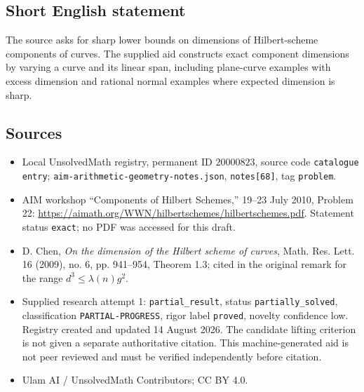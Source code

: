 \documentclass[11pt]{article}
\begin{document}
\subsection{Short English statement}
The source asks for sharp lower bounds on dimensions of Hilbert-scheme components of curves. The supplied aid constructs exact component dimensions by varying a curve and its linear span, including plane-curve examples with excess dimension and rational normal examples where expected dimension is sharp.
\subsection{Sources}
\begin{itemize}
\item Local UnsolvedMath registry, permanent ID \(20000823\), source code \texttt{catalogue entry}; \texttt{aim-arithmetic-geometry-notes.json}, \texttt{notes[68]}, tag \texttt{problem}.
\item AIM workshop ``Components of Hilbert Schemes,'' 19--23 July 2010, Problem 22: \url{https://aimath.org/WWN/hilbertschemes/hilbertschemes.pdf}. Statement status \texttt{exact}; no PDF was accessed for this draft.
\item D. Chen, \emph{On the dimension of the Hilbert scheme of curves}, Math. Res. Lett. 16 (2009), no. 6, pp. 941--954, Theorem 1.3; cited in the original remark for the range \(d^3\le\lambda(n)g^2\).
\item Supplied research attempt 1: \texttt{partial\_result}, status \texttt{partially\_solved}, classification \texttt{PARTIAL-PROGRESS}, rigor label \texttt{proved}, novelty confidence low. Registry created and updated 14 August 2026. The candidate lifting criterion is not given a separate authoritative citation. This machine-generated aid is not peer reviewed and must be verified independently before citation.
\item Ulam AI / UnsolvedMath Contributors; CC BY 4.0.
\end{itemize}
\end{document}
